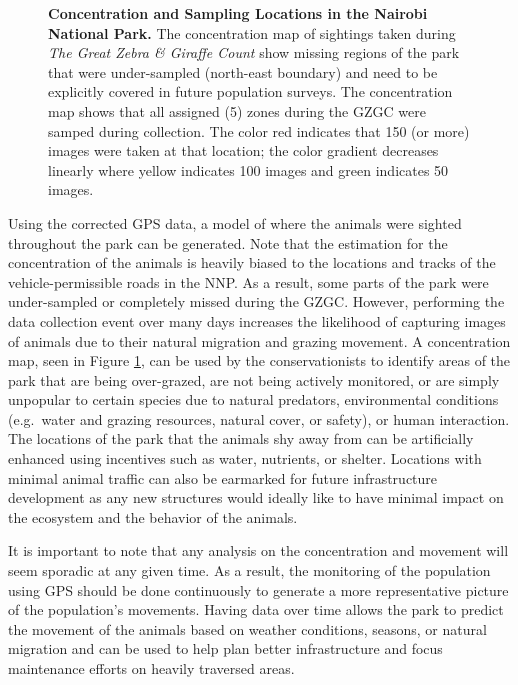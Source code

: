 \begin{figure}[!htb]%
    \centering
        \caption[Concentration and Sampling Locations in the Nairobi National Park]{\textbf{Concentration and Sampling Locations in the Nairobi National Park.}  The concentration map of sightings taken during \textit{The Great Zebra \& Giraffe Count} show missing regions of the park that were under-sampled (north-east boundary) and need to be explicitly covered in future population surveys.  The concentration map shows that all assigned (5) zones during the GZGC were samped during collection.  The color red indicates that 150 (or more) images were taken at that location; the color gradient decreases linearly where yellow indicates 100 images and green indicates 50 images.}
        \label{fig:coverage}
\end{figure}

Using the corrected GPS data, a model of where the animals were sighted throughout the park can be generated.  Note that the estimation for the concentration of the animals is heavily biased to the locations and tracks of the vehicle-permissible roads in the NNP.  As a result, some parts of the park were under-sampled or completely missed during the GZGC.  However, performing the data collection event over many days increases the likelihood of capturing images of animals due to their natural migration and grazing movement.  A concentration map, seen in Figure \ref{fig:coverage}, can be used by the conservationists to identify areas of the park that are being over-grazed, are not being actively monitored, or are simply unpopular to certain species due to natural predators, environmental conditions (e.g.\ water and grazing resources, natural cover, or safety), or human interaction.  The locations of the park that the animals shy away from can be artificially enhanced using incentives such as water, nutrients, or shelter.  Locations with minimal animal traffic can also be earmarked for future infrastructure development as any new structures would ideally like to have minimal impact on the ecosystem and the behavior of the animals.

It is important to note that any analysis on the concentration and movement will seem sporadic at any given time.  As a result, the monitoring of the population using GPS should be done continuously to generate a more representative picture of the population's movements.  Having data over time allows the park to predict the movement of the animals based on weather conditions, seasons, or natural migration and can be used to help plan better infrastructure and focus maintenance efforts on heavily traversed areas.
